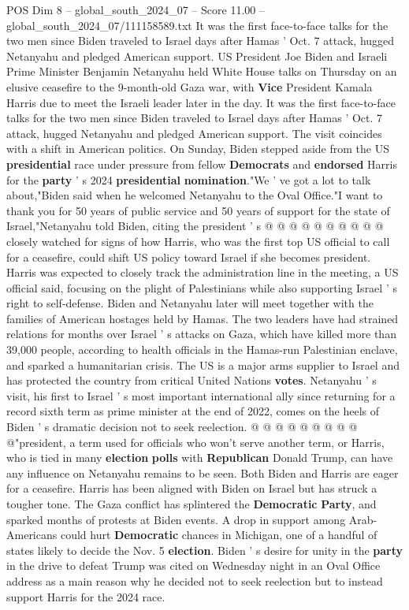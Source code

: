 \begin{textsample}{POS Dim 8 – global\_south\_2024\_07 – Score 11.00 – global\_south\_2024\_07/111158589.txt}  \label{ex:f8_pos_102}
It was the first face-to-face talks for the two men since Biden traveled to Israel days after Hamas ' Oct. 7 attack, hugged Netanyahu and pledged American support.
US President Joe Biden and Israeli Prime Minister Benjamin Netanyahu held White House talks on Thursday on an elusive ceasefire to the 9-month-old Gaza war, with \textbf{Vice} President Kamala Harris due to meet the Israeli leader later in the day.
It was the first face-to-face talks for the two men since Biden traveled to Israel days after Hamas ' Oct. 7 attack, hugged Netanyahu and pledged American support.
The visit coincides with a shift in American politics.
On Sunday, Biden stepped aside from the US \textbf{presidential} race under pressure from fellow \textbf{Democrats} and \textbf{endorsed} Harris for the \textbf{party} ' s 2024 \textbf{presidential} \textbf{nomination}."We ' ve got a lot to talk about,"Biden said when he welcomed Netanyahu to the Oval Office."I want to thank you for 50 years of public service and 50 years of support for the state of Israel,"Netanyahu told Biden, citing the president ' s @ @ @ @ @ @ @ @ @ @ closely watched for signs of how Harris, who was the first top US official to call for a ceasefire, could shift US policy toward Israel if she becomes president.
Harris was expected to closely track the administration line in the meeting, a US official said, focusing on the plight of Palestinians while also supporting Israel ' s right to self-defense.
Biden and Netanyahu later will meet together with the families of American hostages held by Hamas.
The two leaders have had strained relations for months over Israel ' s attacks on Gaza, which have killed more than 39,000 people, according to health officials in the Hamas-run Palestinian enclave, and sparked a humanitarian crisis.
The US is a major arms supplier to Israel and has protected the country from critical United Nations \textbf{votes}.
Netanyahu ' s visit, his first to Israel ' s most important international ally since returning for a record sixth term as prime minister at the end of 2022, comes on the heels of Biden ' s dramatic decision not to seek reelection. @ @ @ @ @ @ @ @ @ @"president, a term used for officials who won't serve another term, or Harris, who is tied in many \textbf{election} \textbf{polls} with \textbf{Republican} Donald Trump, can have any influence on Netanyahu remains to be seen.
Both Biden and Harris are eager for a ceasefire.
Harris has been aligned with Biden on Israel but has struck a tougher tone.
The Gaza conflict has splintered the \textbf{Democratic} \textbf{Party}, and sparked months of protests at Biden events.
A drop in support among Arab-Americans could hurt \textbf{Democratic} chances in Michigan, one of a handful of states likely to decide the Nov. 5 \textbf{election}.
Biden ' s desire for unity in the \textbf{party} in the drive to defeat Trump was cited on Wednesday night in an Oval Office address as a main reason why he decided not to seek reelection but to instead support Harris for the 2024 race.

\end{textsample}
